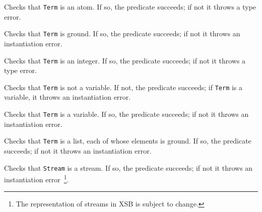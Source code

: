 \begin{description}
Checks that {\tt Term} is an atom.  If so, the predicate succeeds;
if not it throws a type error.

Checks that {\tt Term} is ground.  If so, the predicate succeeds;
if not it throws an instantiation error.

Checks that {\tt Term} is an integer.  If so, the predicate succeeds;
if not it throws a type error.

Checks that {\tt Term} is not a variable.  If not, the predicate succeeds;
if {\tt Term} is a variable,  it throws an instantiation error.

Checks that {\tt Term} is a variable.  If so, the predicate succeeds;
if not it throws an instantiation error.

Checks that {\tt Term} is a list, each of whose elements is ground.
If so, the predicate succeeds; if not it throws an instantiation
error.
	    
Checks that {\tt Stream} is a stream.  If so, the predicate succeeds;
if not it throws an instantiation error~\footnote{The representation
of streams in XSB is subject to change.}.

\end{description}

